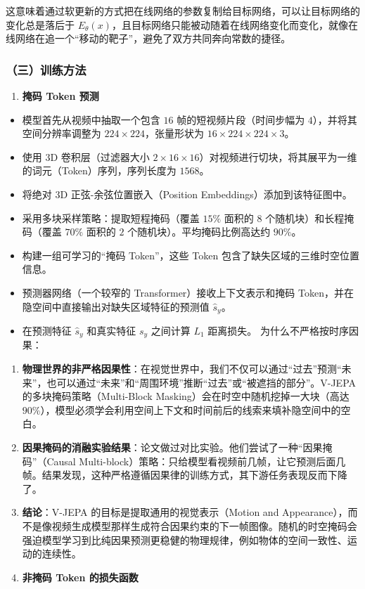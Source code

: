 这意味着通过软更新的方式把在线网络的参数复制给目标网络，可以让目标网络的变化总是落后于 \(E_\theta(x)\)，且目标网络只能被动随着在线网络变化而变化，就像在线网络在追一个``移动的靶子''，避免了双方共同奔向常数的捷径。

\hypertarget{ux4e09ux8badux7ec3ux65b9ux6cd5-1}{%
\subsubsection{（三）训练方法}\label{ux4e09ux8badux7ec3ux65b9ux6cd5-1}}

\begin{enumerate}
\def\labelenumi{\arabic{enumi}.}
\tightlist
\item
  \textbf{掩码 Token 预测}
\end{enumerate}

\begin{itemize}
\item
  模型首先从视频中抽取一个包含 \(16\) 帧的短视频片段（时间步幅为 \(4\)），并将其空间分辨率调整为 \(224\times224\)，张量形状为 \(16\times224\times224\times3\)。
\item
  使用 3D 卷积层（过滤器大小 \(2\times16\times16\)）对视频进行切块，将其展平为一维的词元（Token）序列，序列长度为 \(1568\)。
\item
  将绝对 3D 正弦-余弦位置嵌入（Position Embeddings）添加到该特征图中。
\item
  采用多块采样策略：提取短程掩码（覆盖 \(15\%\) 面积的 \(8\) 个随机块）和长程掩码（覆盖 \(70\%\) 面积的 \(2\) 个随机块）。平均掩码比例高达约 \(90\%\)。
\item
  构建一组可学习的``掩码 Token''，这些 Token 包含了缺失区域的三维时空位置信息。
\item
  预测器网络（一个较窄的 Transformer）接收上下文表示和掩码 Token，并在隐空间中直接输出对缺失区域特征的预测值 \(\hat{s}_y\)。
\item
  在预测特征 \(\hat{s}_y\) 和真实特征 \(s_y\) 之间计算 \(L_1\) 距离损失。
  为什么不严格按时序因果：
\end{itemize}

\begin{enumerate}
\def\labelenumi{\arabic{enumi}.}
\item
  \textbf{物理世界的非严格因果性}：在视觉世界中，我们不仅可以通过``过去''预测``未来''，也可以通过``未来''和``周围环境''推断``过去''或``被遮挡的部分''。V-JEPA 的多块掩码策略（Multi-Block Masking）会在时空中随机挖掉一大块（高达 \(90\%\)），模型必须学会利用空间上下文和时间前后的线索来填补隐空间中的空白。
\item
  \textbf{因果掩码的消融实验结果}：论文做过对比实验。他们尝试了一种``因果掩码''（Causal Multi-block）策略：只给模型看视频前几帧，让它预测后面几帧。结果发现，这种严格遵循因果律的训练方式，其下游任务表现反而下降了。
\item
  \textbf{结论}：V-JEPA 的目标是提取通用的视觉表示（Motion and Appearance），而不是像视频生成模型那样生成符合因果约束的下一帧图像。随机的时空掩码会强迫模型学习到比纯因果预测更稳健的物理规律，例如物体的空间一致性、运动的连续性。
\item
  \textbf{非掩码 Token 的损失函数}
\end{enumerate}

